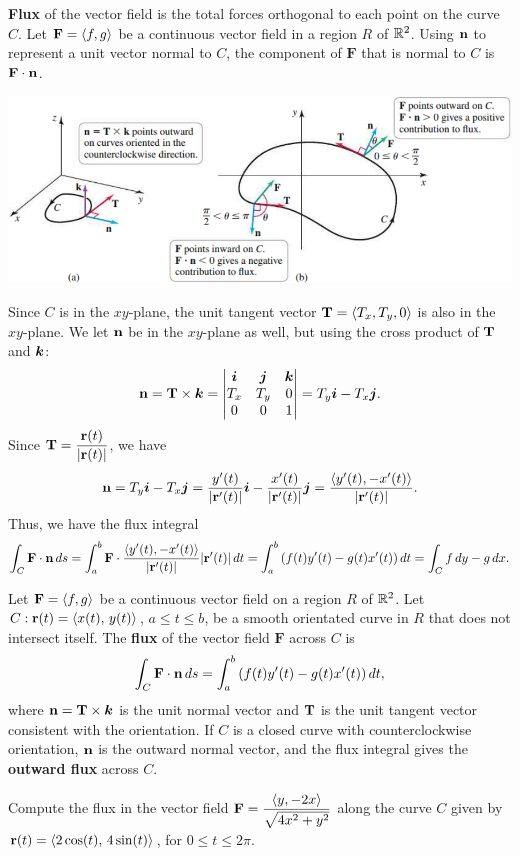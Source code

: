 \documentclass[../mathNotesPreamble]{subfiles}
\begin{document}
  \textbf{Flux} of the vector field is the total forces orthogonal to each point on the curve $C$. Let $\mathbf F={\left\langle f,g \right\rangle}$ be a continuous vector field in a region $R$ of $\mathbb{R}^2$. Using ${\mathbf{n}}$ to represent a unit vector normal to $C$, the component of $\mathbf F$ that is normal to $C$ is $\mathbf F\cdot{\mathbf{n}}$. 
  \begin{center}
    \includegraphics[width=0.95\linewidth]{../images/briggs_17_02/fig17_26}
  \end{center}

  Since $C$ is in the $xy$-plane, the unit tangent vector ${\mathbf{T}}={\left\langle T_x,T_y,0 \right\rangle}$ is also in the $xy$-plane. We let ${\mathbf{n}}$ be in the $xy$-plane as well, but using the cross product of ${\mathbf{T}}$ and ${\bm{k}}$:
  \begin{align*}
    {\mathbf{n}}={\mathbf{T}}\times{\bm{k}}=
    \begin{vmatrix}
      {\bm{i}}& {\bm{j}}& {\bm{k}}\\
      T_x& T_y& 0\\
      0& 0& 1
    \end{vmatrix}
    = T_y{\bm{i}}-T_x{\bm{j}}.
  \end{align*}
  Since ${\mathbf{T}}=\dfrac{{\mathbf{r}}(t)}{{\left\vert{\mathbf{r}}(t)\right\vert}}$, we have 
    \[{\mathbf{n}}=T_y{\bm{i}}-T_x{\bm{j}}=\frac{y'(t)}{{\left\vert{\mathbf{r}}'(t)\right\vert}}{\bm{i}}-\frac{x'(t)}{{\left\vert{\mathbf{r}}'(t)\right\vert}}{\bm{j}}=\frac{{\left\langle y'(t),-x'(t) \right\rangle}}{{\left\vert{\mathbf{r}}'(t)\right\vert}}.\]
  Thus, we have the flux integral
    \[\int_C \mathbf F\cdot{\mathbf{n}}\,ds =\int_a^b \mathbf F\cdot \frac{{\left\langle y'(t),-x'(t) \right\rangle}}{{\left\vert{\mathbf{r}}'(t)\right\vert}} {\left\vert{\mathbf{r}}'(t)\right\vert}\,dt=\int_a^b {\left(f(t)y'(t)-g(t)x'(t)\right)}\,dt=\int_C f\,dy-g\,dx.\]
  \pagebreak

  \begin{defn*}[Flux]
    Let $\mathbf F={\left\langle f,g \right\rangle}$ be a continuous vector field on a region $R$ of $\mathbb{R}^2$. Let $C: {\mathbf{r}}(t)={\left\langle x(t),\,y(t) \right\rangle}$, $a\leq t\leq b$, be a smooth orientated curve in $R$ that does not intersect itself. The \textbf{flux} of the vector field $\mathbf F$ across $C$ is
      \[\int_C \mathbf F\cdot {\mathbf{n}}\,ds=\int_a^b {\left(f(t)y'(t)-g(t)x'(t)\right)}\,dt,\]
    where ${\mathbf{n}}={\mathbf{T}}\times{\bm{k}}$ is the unit normal vector and ${\mathbf{T}}$ is the unit tangent vector consistent with the orientation. If $C$ is a closed curve with counterclockwise orientation, ${\mathbf{n}}$ is the outward normal vector, and the flux integral gives the \textbf{outward flux} across $C$.
  \end{defn*}

  \begin{ex*}
    Compute the flux in the vector field $\mathbf F=\dfrac{{\left\langle y,-2x \right\rangle}}{\sqrt{4x^2+y^2}}$ along the curve $C$ given by ${\mathbf{r}}(t)={\left\langle 2\cos(t),\,4\sin(t) \right\rangle}$, for $0\leq t\leq 2\pi$.
  \end{ex*}
  \pagebreak
  
\end{document}
